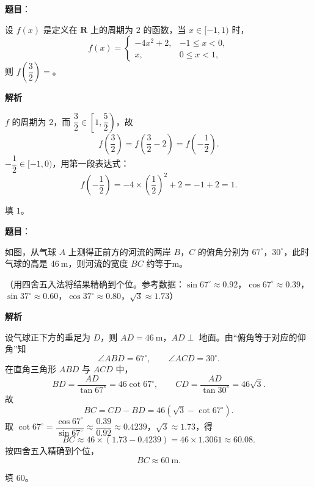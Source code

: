 \begin{answer}

\textbf{题目}：

设 $f(x)$ 是定义在 $\mathbf R$ 上的周期为 $2$ 的函数，当 $x\in[-1,1)$ 时，
\nopagebreak[4]
\[f(x)=\begin{cases}-4x^2+2,&-1\leqslant x<0,\\x,&0\leqslant x<1,\end{cases}\]
则 $f\left(\dfrac32\right)=$\gkblank{}。

\textbf{解析}

$f$ 的周期为 $2$，而 $\dfrac32\in\left[1,\dfrac52\right)$，故
\nopagebreak[4]
\[f\left(\frac32\right)=f\left(\frac32-2\right)=f\left(-\frac12\right).\]
$-\dfrac12\in[-1,0)$，用第一段表达式：
\nopagebreak[4]
\[f\left(-\frac12\right)=-4\times\left(\frac12\right)^2+2=-1+2=1 .\]

填 $1$。


\end{answer}
\begin{answer}

\textbf{题目}：

如图，从气球 $A$ 上测得正前方的河流的两岸 $B$，$C$ 的俯角分别为 $67^\circ$，$30^\circ$，此时气球的高是 $46\ \mathrm m$，则河流的宽度 $BC$ 约等于\gkblank{}$\mathrm m$。

（用四舍五入法将结果精确到个位。参考数据：$\sin67^\circ\approx 0.92$，$\cos67^\circ\approx 0.39$，$\sin37^\circ\approx 0.60$，$\cos37^\circ\approx 0.80$，$\sqrt3\approx 1.73$）
\nopagebreak[4]
\begin{center}\end{center}
\nopagebreak[4]
\textbf{解析}

设气球正下方的垂足为 $D$，则 $AD=46\ \mathrm m$，$AD\perp$ 地面。由“俯角等于对应的仰角”知
\nopagebreak[4]
\[\angle ABD=67^\circ,\qquad \angle ACD=30^\circ .\]
在直角三角形 $ABD$ 与 $ACD$ 中，
\nopagebreak[4]
\[BD=\frac{AD}{\tan67^\circ}=46\cot67^\circ,\qquad
CD=\frac{AD}{\tan30^\circ}=46\sqrt3 .\]
故
\nopagebreak[4]
\[BC=CD-BD=46\left(\sqrt3-\cot67^\circ\right).\]
取 $\cot67^\circ=\dfrac{\cos67^\circ}{\sin67^\circ}\approx\dfrac{0.39}{0.92}\approx 0.4239$，$\sqrt3\approx 1.73$，得
\nopagebreak[4]
\[BC\approx 46\times(1.73-0.4239)=46\times 1.3061\approx 60.08 .\]
按四舍五入精确到个位，
\nopagebreak[4]
\[BC\approx 60\ \mathrm m .\]

填 $60$。


\end{answer}

